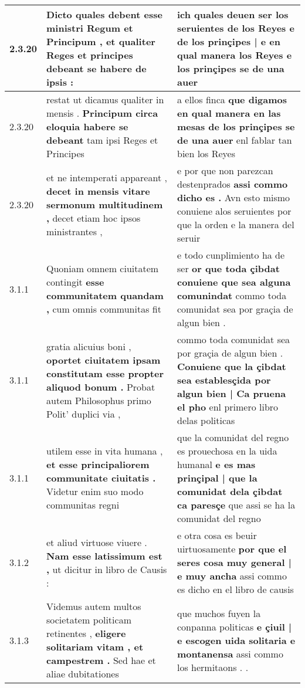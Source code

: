 \begin{tabular}{|p{1cm}|p{6.5cm}|p{6.5cm}|}
2.3.20 & Dicto quales debent \textbf{ esse ministri Regum et Principum , } et qualiter Reges et principes debeant se habere de ipsis : & ich quales deuen ser los seruientes de los Reyes \textbf{ e de los prinçipes | e en qual manera los Reyes } e los prinçipes se de una auer \\\hline
2.3.20 & restat ut dicamus qualiter in mensis . \textbf{ Principum circa eloquia habere se debeant } tam ipsi Reges et Principes & a ellos finca \textbf{ que digamos en qual manera en las mesas de los prinçipes se de una auer } enl fablar tan bien los Reyes \\\hline
2.3.20 & et ne intemperati appareant , \textbf{ decet in mensis vitare sermonum multitudinem , } decet etiam hoc ipsos ministrantes , & e por que non parezcan destenprados \textbf{ assi commo dicho es . } Avn esto mismo conuiene alos seruientes por que la orden e la manera del seruir \\\hline
3.1.1 & Quoniam omnem ciuitatem contingit \textbf{ esse communitatem quandam , } cum omnis communitas fit & e todo cunplimiento ha de ser \textbf{ or que toda çibdat conuiene que sea alguna comunindat } commo toda comunidat sea por graçia de algun bien . \\\hline
3.1.1 & gratia alicuius boni , \textbf{ oportet ciuitatem ipsam constitutam esse propter aliquod bonum . } Probat autem Philosophus primo Polit’ duplici via , & commo toda comunidat sea por graçia de algun bien . \textbf{ Conuiene que la çibdat sea establesçida por algun bien | Ca pruena el pho } enl primero libro delas politicas \\\hline
3.1.1 & utilem esse in vita humana , \textbf{ et esse principaliorem communitate ciuitatis . } Videtur enim suo modo communitas regni & que la comunidat del regno es prouechosa en la uida humanal \textbf{ e es mas prinçipal | que la comunidat dela çibdat ca paresçe } que assi se ha la comunidat del regno \\\hline
3.1.2 & et aliud virtuose viuere . \textbf{ Nam esse latissimum est , } ut dicitur in libro de Causis : & e otra cosa es beuir uirtuosamente \textbf{ por que el seres cosa muy general | e muy ancha } assi commo es dicho en el libro de causis \\\hline
3.1.3 & Videmus autem multos societatem politicam retinentes , \textbf{ eligere solitariam vitam , et campestrem . } Sed hae et aliae dubitationes & que muchos fuyen la conpanna politicas \textbf{ e çiuil | e escogen uida solitaria e montanensa } assi commo los hermitaons . . \\\hline

\end{tabular}
